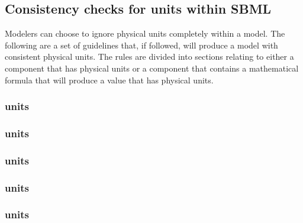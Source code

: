 \subsection{Consistency checks for units within SBML}

Modelers can choose to ignore physical units completely 
within a model.  The following are a set of guidelines that,
if followed, will produce a model with consistent physical units.
The rules are divided into sections relating to either a component 
that has physical units or a component that contains a mathematical
formula that will produce a value that has physical units.

\subsubsection*{ units} \begin{sbmlenum}


\end{sbmlenum} \subsubsection*{ units} \begin{sbmlenum}


\end{sbmlenum} \subsubsection*{ units} \begin{sbmlenum}


\end{sbmlenum} \subsubsection*{ units} \begin{sbmlenum}


\end{sbmlenum} \subsubsection*{ units} \begin{sbmlenum}


\end{sbmlenum}

